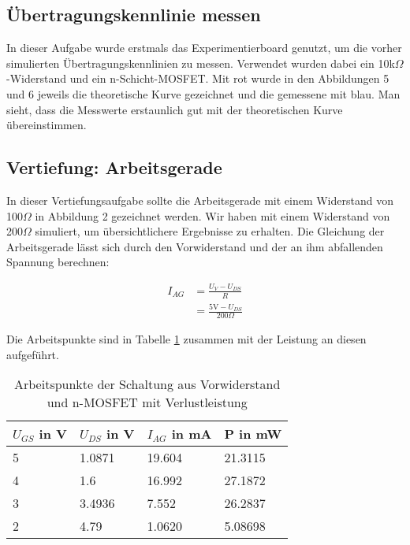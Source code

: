 \documentclass[12pt,a4paper]{scrartcl}
\begin{document}
\subsection{\"Ubertragungskennlinie messen}
In dieser Aufgabe wurde erstmals das Experimentierboard genutzt, um die vorher simulierten \"Ubertragungskennlinien zu messen.
Verwendet wurden dabei ein 10k$\Omega$-Widerstand und ein n-Schicht-MOSFET.
Mit rot wurde in den Abbildungen 5 und 6 jeweils die theoretische Kurve gezeichnet und die gemessene mit blau.
Man sieht, dass die Messwerte erstaunlich gut mit der theoretischen Kurve \"ubereinstimmen.

\subsection*{Vertiefung: Arbeitsgerade}
In dieser Vertiefungsaufgabe sollte die Arbeitsgerade mit einem Widerstand von 100$\Omega$ in Abbildung 2 gezeichnet werden.
Wir haben mit einem Widerstand von 200$\Omega$ simuliert, um \"ubersichtlichere Ergebnisse zu erhalten.
Die Gleichung der Arbeitsgerade l\"asst sich durch den Vorwiderstand und der an ihm abfallenden Spannung berechnen:

\begin{align*}
I_{AG} & = \frac{U_V - U_{DS}}{R} \\ 
& = \frac{5\text{V} - U_{DS}}{200\Omega}
\end{align*}

Die Arbeitspunkte sind in Tabelle \ref{tab:arbeitspunkte} zusammen mit der Leistung an diesen aufgef\"uhrt.

\begin{table}[h]
    \centering
    \begin{tabular}{l|l|l|l}
    \hline
    $U_{GS}$ in V & $U_{DS}$ in V     & $I_{AG}$ in mA  & P in mW \\
    \hline
    5             & 1.0871            & 19.604        & 21.3115 \\
    4             & 1.6               & 16.992        & 27.1872 \\
    3             & 3.4936            & 7.552         & 26.2837 \\
    2             & 4.79              & 1.0620        & 5.08698 \\
    \hline
    \end{tabular}
    \caption{Arbeitspunkte der Schaltung aus Vorwiderstand und n-MOSFET mit Verlustleistung}
    \label{tab:arbeitspunkte}
\end{table}
\end{document}
